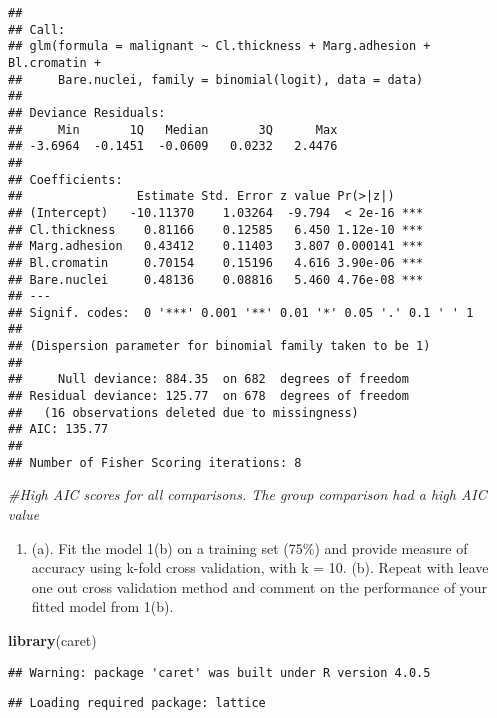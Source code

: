 \documentclass[
]{article}
\newenvironment{Shaded}{\begin{snugshade}}{\end{snugshade}}
\newcommand{\CommentTok}[1]{\textcolor[rgb]{0.56,0.35,0.01}{\textit{#1}}}
\newcommand{\KeywordTok}[1]{\textcolor[rgb]{0.13,0.29,0.53}{\textbf{#1}}}
\newcommand{\NormalTok}[1]{#1}
\providecommand{\tightlist}{%
  \setlength{\itemsep}{0pt}\setlength{\parskip}{0pt}}
\begin{document}
\begin{verbatim}
## 
## Call:
## glm(formula = malignant ~ Cl.thickness + Marg.adhesion + Bl.cromatin + 
##     Bare.nuclei, family = binomial(logit), data = data)
## 
## Deviance Residuals: 
##     Min       1Q   Median       3Q      Max  
## -3.6964  -0.1451  -0.0609   0.0232   2.4476  
## 
## Coefficients:
##                Estimate Std. Error z value Pr(>|z|)    
## (Intercept)   -10.11370    1.03264  -9.794  < 2e-16 ***
## Cl.thickness    0.81166    0.12585   6.450 1.12e-10 ***
## Marg.adhesion   0.43412    0.11403   3.807 0.000141 ***
## Bl.cromatin     0.70154    0.15196   4.616 3.90e-06 ***
## Bare.nuclei     0.48136    0.08816   5.460 4.76e-08 ***
## ---
## Signif. codes:  0 '***' 0.001 '**' 0.01 '*' 0.05 '.' 0.1 ' ' 1
## 
## (Dispersion parameter for binomial family taken to be 1)
## 
##     Null deviance: 884.35  on 682  degrees of freedom
## Residual deviance: 125.77  on 678  degrees of freedom
##   (16 observations deleted due to missingness)
## AIC: 135.77
## 
## Number of Fisher Scoring iterations: 8
\end{verbatim}

\begin{Shaded}
\begin{Highlighting}[]
\CommentTok{#High AIC scores for all comparisons. The group comparison had a high AIC value}
\end{Highlighting}
\end{Shaded}

\begin{enumerate}
\def\labelenumi{\arabic{enumi}.}
\setcounter{enumi}{1}
\tightlist
\item
  (a). Fit the model 1(b) on a training set (75\%) and provide measure
  of accuracy using k-fold cross validation, with k = 10. (b). Repeat
  with leave one out cross validation method and comment on the
  performance of your fitted model from 1(b).
\end{enumerate}

\begin{Shaded}
\begin{Highlighting}[]
\KeywordTok{library}\NormalTok{(caret)}
\end{Highlighting}
\end{Shaded}

\begin{verbatim}
## Warning: package 'caret' was built under R version 4.0.5
\end{verbatim}

\begin{verbatim}
## Loading required package: lattice
\end{verbatim}
\end{document}
